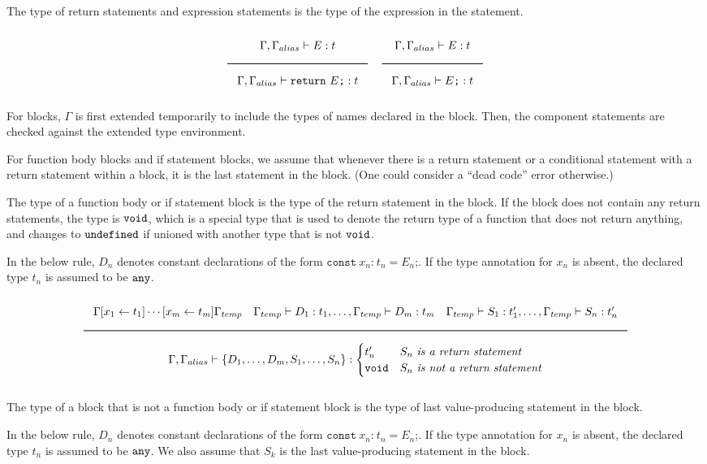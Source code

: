 The type of return statements and expression statements is the type of the expression in the statement.

\noindent
\[
  \Rule{\Gamma, \Gamma_{alias} \vdash E : t}{\Gamma, \Gamma_{alias} \vdash \texttt{return}\ E\texttt{;} : t}
  \quad
  \Rule{\Gamma, \Gamma_{alias} \vdash E : t}{\Gamma, \Gamma_{alias} \vdash E\texttt{;} : t}
\]
\noindent

For blocks, $\Gamma$ is first extended temporarily to include the types of names declared in the block.
Then, the component statements are checked against the extended type environment.

For function body blocks and if statement blocks, we assume that whenever there is a return statement
or a conditional statement with a return statement within a block, it is the last statement in the block.
(One could consider a ``dead code'' error otherwise.)

The type of a function body or if statement block is the type of the return statement in the block.
If the block does not contain any return statements, the type is $\texttt{void}$,
which is a special type that is used to denote the return type of a function that does not return anything,
and changes to $\texttt{undefined}$ if unioned with another type that is not $\texttt{void}$.

In the below rule, $D_n$ denotes constant declarations of the form $\texttt{const}\ x_n \texttt{:}\ t_n = E_n\texttt{;}$.
If the type annotation for $x_n$ is absent, the declared type $t_n$ is assumed to be $\texttt{any}$.

\noindent
\[
  \Rule{\Gamma [x_1 \leftarrow t_1] \cdots [x_m \leftarrow t_m] \Gamma_{temp} \quad
    \Gamma_{temp} \vdash D_1 : t_1, \ldots, \Gamma_{temp} \vdash D_m : t_m \quad
    \Gamma_{temp} \vdash S_1 : t'_1, \ldots, \Gamma_{temp} \vdash S_n : t'_n
    }{\Gamma, \Gamma_{alias} \vdash \{ D_1, \ldots, D_m, S_1, \ldots, S_n\} : 
      \begin{cases}
        t'_n & S_n\ \textit{is a return statement} \\
        \Void & S_n\ \textit{is not a return statement}
      \end{cases}
    }
\]
\noindent

The type of a block that is not a function body or if statement block is the type of last value-producing statement in the block.

In the below rule, $D_n$ denotes constant declarations of the form $\texttt{const}\ x_n \texttt{:}\ t_n = E_n\texttt{;}$.
If the type annotation for $x_n$ is absent, the declared type $t_n$ is assumed to be $\texttt{any}$.
We also assume that $S_k$ is the last value-producing statement in the block.

